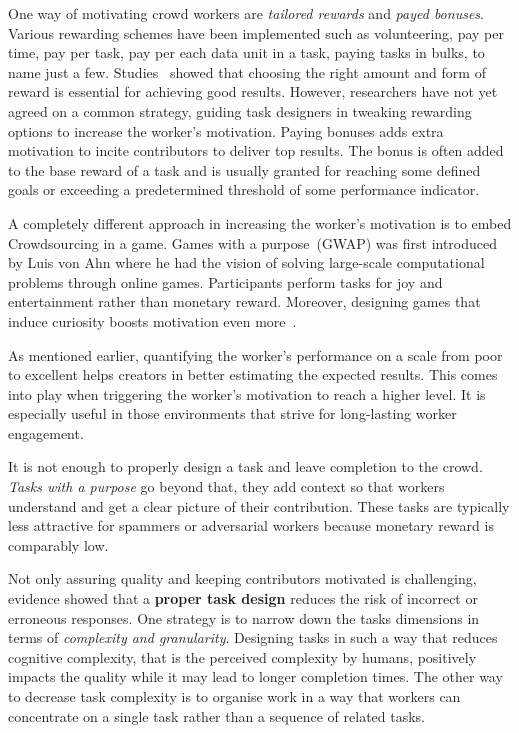 One way of motivating crowd workers are \textit{tailored rewards} and \textit{payed bonuses}. Various rewarding schemes have been implemented such as volunteering, pay per time, pay per task, pay per each data unit in a task, paying tasks in bulks, to name just a few. Studies~\cite{faradani2011, ho2015} showed that choosing the right amount and form of reward is essential for achieving good results. However, researchers have not yet agreed on a common strategy, guiding task designers in tweaking rewarding options to increase the worker's motivation. 
Paying bonuses adds extra motivation to incite contributors to deliver top results. The bonus is often added to the base reward of a task and is usually granted for reaching some defined goals or exceeding a predetermined threshold of some performance indicator. 

A completely different approach in increasing the worker's motivation is to embed Crowdsourcing in a game. Games with a purpose~(GWAP) was first introduced by Luis von Ahn\cite{ahn2006} where he had the vision of solving large-scale computational problems through online games. Participants perform tasks for joy and entertainment rather than monetary reward. Moreover, designing games that induce curiosity boosts motivation even more~\cite{law2016}. 

As mentioned earlier, quantifying the worker's performance on a scale from poor to excellent helps creators in better estimating the expected results. This comes into play when triggering the worker's motivation to reach a higher level. It is especially useful in those environments that strive for long-lasting worker engagement. 

It is not enough to properly design a task and leave completion to the crowd. \emph{Tasks with a purpose} go beyond that, they add context so that workers understand and get a clear picture of their contribution. These tasks are typically less attractive for spammers or adversarial workers because monetary reward is comparably low. 

Not only assuring quality and keeping contributors motivated is challenging, evidence showed that a \textbf{proper task design} reduces the risk of incorrect or erroneous responses. One strategy is to narrow down the tasks dimensions in terms of \emph{complexity and granularity}. Designing tasks in such a way that reduces cognitive complexity, that is the perceived complexity by humans, positively impacts the quality while it may lead to longer completion times. The other way to decrease task complexity is to organise work in a way that workers can concentrate on a single task rather than a sequence of related tasks.  

